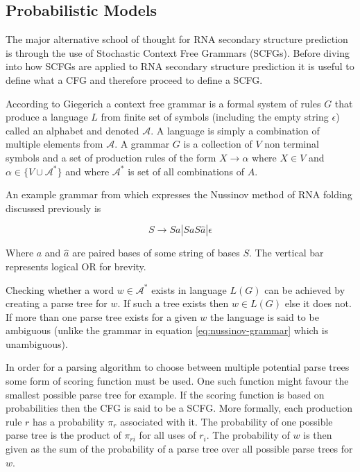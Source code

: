 \documentclass[journal]{IEEEtran}
\begin{document}
\subsection{Probabilistic Models}
\label{subsec:probalistic-models}
The major alternative school of thought for RNA secondary structure prediction is through the use of Stochastic Context Free Grammars (SCFGs). Before diving into how SCFGs are applied to RNA secondary structure prediction it is useful to define what a CFG and therefore proceed to define a SCFG. 

According to Giegerich\cite{giegerich2014introduction} a context free grammar is a formal system of rules $G$ that produce a language $L$ from finite set of symbols (including the empty string $\epsilon$) called an alphabet and denoted $\mathcal{A}$. A language is simply a combination of multiple elements from $\mathcal{A}$. A grammar $G$ is a collection of $V$ non terminal symbols and a set of production rules of the form $X \rightarrow \alpha$ where $X \in V$ and $\alpha \in \{V \cup \mathcal{A}^*\}$ and where $\mathcal{A}^*$ is set of all combinations of $A$.

An example grammar from \cite{rivas2013four} which expresses the Nussinov method \cite{nussinov1980fast} of RNA folding discussed previously is

\begin{equation}
	\label{eq:nussinov-grammar}
	S \rightarrow S a | S a S \hat{a} | \epsilon
\end{equation} 

Where $a$ and $\hat{a}$ are paired bases of some string of bases $S$. The vertical bar represents logical OR for brevity.

Checking whether a word $w \in \mathcal{A}^*$ exists in language $L(G)$ can be achieved by creating a parse tree for $w$. If such a tree exists then $w \in L(G)$ else it does not. If more than one parse tree exists for a given $w$ the language is said to be ambiguous (unlike the grammar in equation \ref{eq:nussinov-grammar} which is unambiguous).

In order for a parsing algorithm to choose between multiple potential parse trees some form of scoring function must be used. One such function might favour the smallest possible parse tree for example. If the scoring function is based on probabilities then the CFG is said to be a SCFG. More formally, each production rule $r$ has a probability $\pi_r$ associated with it. The probability of one possible parse tree is the product of $\pi_{ri}$ for all uses of $r_i$. The probability of $w$ is then given as the sum of the probability of a parse tree over all possible parse trees for $w$.
\end{document}
